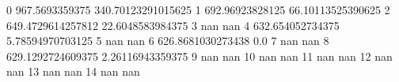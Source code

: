 0 967.5693359375 340.70123291015625
1 692.96923828125 66.10113525390625
2 649.4729614257812 22.6048583984375
3 nan nan
4 632.654052734375 5.78594970703125
5 nan nan
6 626.8681030273438 0.0
7 nan nan
8 629.1292724609375 2.26116943359375
9 nan nan
10 nan nan
11 nan nan
12 nan nan
13 nan nan
14 nan nan
